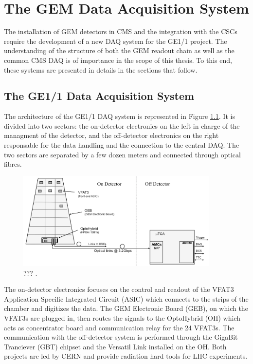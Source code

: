 \chapter{The GEM Data Acquisition System}
\label{chap:II-2-daq}

  The installation of GEM detectors in CMS and the integration with the CSCs require the development of a new DAQ system for the GE1/1 project. The understanding of the structure of both the GEM readout chain as well as the common CMS DAQ is of importance in the scope of this thesis. To this end, these systems are presented in details in the sections that follow. \\

  \section{The GE1/1 Data Acquisition System}

    The architecture of the GE1/1 DAQ system is represented in Figure \ref{fig:II-2-daq-gem-system}. It is divided into two sectors: the on-detector electronics on the left in charge of the managment of the detector, and the off-detector electronics on the right responsable for the data handling and the connection to the central DAQ. The two sectors are separated by a few dozen meters and connected through optical fibres. \\

    \begin{figure}[h!]
      \centering
      \includegraphics[width=0.9\textwidth]{img/II-2-daq/gem-system.pdf}
      \caption{??? \cite{Colaleo:2021453}.}
      \label{fig:II-2-daq-gem-system}
    \end{figure}

    The on-detector electronics focuses on the control and readout of the VFAT3 Application Specific Integrated Circuit (ASIC) which connects to the strips of the chamber and digitizes the data. The GEM Electronic Board (GEB), on which the VFAT3s are plugged in, then routes the signals to the OptoHybrid (OH) which acts as concentrator board and communication relay for the 24 VFAT3s. The communication with the off-detector system is performed through the GigaBit Tranciever (GBT) chipset and the Versatil Link installed on the OH. Both projects are led by CERN and provide radiation hard tools for LHC experiments. \\

